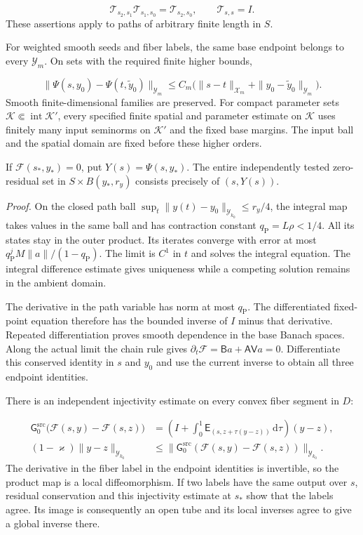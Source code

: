 \documentclass[
  english,
  11pt,
  reqno]{amsart}
\begin{document}
\label{eq:online-current-transport-composition} \[
\mathscr T_{s_2,s_1}\mathscr T_{s_1,s_0}
=\mathscr T_{s_2,s_0},\qquad
\mathscr T_{s,s}=I.
\] These assertions apply to paths of arbitrary finite length in \(S\).

For weighted smooth seeds and fiber labels, the same base endpoint
belongs to every \(\mathcal Y_m\). On sets with the required finite
higher bounds,

\label{eq:online-current-higher-endpoint-difference} \[
\|\Psi(s,y_0)-\Psi(t,\widetilde y_0)\|_{\mathcal Y_m}
\le C_m\bigl(\|s-t\|_{\mathcal X_m}
                   +\|y_0-\widetilde y_0\|_{\mathcal Y_m}\bigr).
\] Smooth finite-dimensional families are preserved. For compact
parameter sets \(\mathcal K\Subset\operatorname{int}\mathcal K'\), every
specified finite spatial and parameter estimate on \(\mathcal K\) uses
finitely many input seminorms on \(\mathcal K'\) and the fixed base
margins. The input ball and the spatial domain are fixed before these
higher orders.

If \(\mathcal F(s_*,y_*)=0\), put \(Y(s)=\Psi(s,y_*)\). The entire
independently tested zero-residual set in \(S\times B(y_*,r_y)\)
consists precisely of \((s,Y(s))\).

\emph{Proof.} On the closed path ball
\(\sup_t\|y(t)-y_0\|_{\mathcal Y_{k_0}}\le r_y/4\), the integral map
takes values in the same ball and has contraction constant
\(q_{\mathrm P}=L\rho<1/4\). All its states stay in the outer product.
Its iterates converge with error at most
\(q_{\mathrm P}^jM\|a\|/(1-q_{\mathrm P})\). The limit is \(C^1\) in
\(t\) and solves the integral equation. The integral difference estimate
gives uniqueness while a competing solution remains in the ambient
domain.

The derivative in the path variable has norm at most \(q_{\mathrm P}\).
The differentiated fixed-point equation therefore has the bounded
inverse of \(I\) minus that derivative. Repeated differentiation proves
smooth dependence in the base Banach spaces. Along the actual limit the
chain rule gives
\(\partial_t\mathcal F=\mathsf B a+\mathsf A\mathsf V a=0\).
Differentiate this conserved identity in \(s\) and \(y_0\) and use the
current inverse to obtain all three endpoint identities.

There is an independent injectivity estimate on every convex fiber
segment in \(D\):

\label{eq:online-current-fiber-injectivity} \[
\begin{aligned}
\mathsf G_0^{\mathrm{src}}\bigl(\mathcal F(s,y)-\mathcal F(s,z)\bigr)
&=\left(I+\int_0^1
\mathsf E_{(s,z+\tau(y-z))}\,\mathrm d\tau\right)(y-z),\\
(1-\varkappa)\|y-z\|_{\mathcal Y_{k_0}}
&\le
\|\mathsf G_0^{\mathrm{src}}(\mathcal F(s,y)-\mathcal F(s,z))\|_{\mathcal Y_{k_0}}.
\end{aligned}
\] The derivative in the fiber label in the endpoint identities is
invertible, so the product map is a local diffeomorphism. If two labels
have the same output over \(s\), residual conservation and this
injectivity estimate at \(s_*\) show that the labels agree. Its image is
consequently an open tube and its local inverses agree to give a global
inverse there.
\end{document}
